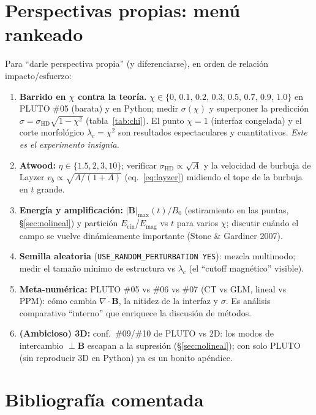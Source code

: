 \documentclass[11pt,a4paper]{article}
\newcommand{\B}{\mathbf{B}}
\newcommand{\code}[1]{\texttt{#1}}
\begin{document}
\section{Perspectivas propias: menú rankeado}
\label{sec:perspectivas}

Para ``darle perspectiva propia'' (y diferenciarse), en orden de relación impacto/esfuerzo:

\begin{enumerate}
  \item \textbf{Barrido en $\chi$ contra la teoría.}
  $\chi\in\{0,\,0.1,\,0.2,\,0.3,\,0.5,\,0.7,\,0.9,\,1.0\}$ en PLUTO \#05 (barata) y en
  Python; medir $\sigma(\chi)$ y superponer la predicción
  $\sigma=\sigma_\mathrm{HD}\sqrt{1-\chi^2}$ (tabla~\ref{tab:chi}). El punto $\chi=1$
  (interfaz congelada) y el corte morfológico $\lambda_c=\chi^2$ son resultados
  espectaculares y cuantitativos. \emph{Este es el experimento insignia.}
  \item \textbf{Atwood:} $\eta\in\{1.5,2,3,10\}$; verificar $\sigma_\mathrm{HD}\propto\sqrt{A}$
  y la velocidad de burbuja de Layzer $v_b\propto\sqrt{A/(1+A)}$ (eq.~\ref{eq:layzer})
  midiendo el tope de la burbuja en $t$ grande.
  \item \textbf{Energía y amplificación:} $|\B|_\mathrm{max}(t)/B_0$ (estiramiento en las
  puntas, §\ref{sec:nolineal}) y partición $E_\mathrm{cin}$/$E_\mathrm{mag}$ vs $t$
  para varios $\chi$; discutir cuándo el campo se vuelve dinámicamente importante
  (Stone \& Gardiner 2007).
  \item \textbf{Semilla aleatoria} (\code{USE\_RANDOM\_PERTURBATION YES}): mezcla multimodo;
  medir el tamaño mínimo de estructura vs $\lambda_c$ (el ``cutoff magnético'' visible).
  \item \textbf{Meta-numérica:} PLUTO \#05 vs \#06 vs \#07 (CT vs GLM, lineal vs PPM):
  cómo cambia $\nabla\cdot\B$, la nitidez de la interfaz y $\sigma$. Es análisis comparativo
  ``interno'' que enriquece la discusión de métodos.
  \item \textbf{(Ambicioso) 3D:} conf.\ \#09/\#10 de PLUTO vs 2D: los modos de intercambio
  $\perp\B$ escapan a la supresión (§\ref{sec:nolineal}); con solo PLUTO (sin reproducir 3D
  en Python) ya es un bonito apéndice.
\end{enumerate}

\section{Bibliografía comentada}
\label{sec:biblio}
\end{document}
